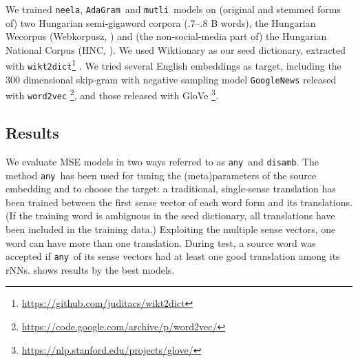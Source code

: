 \documentclass[11pt]{article}
\newcommand{\neelakantan}{\texttt{neela}}
\newcommand{\adagram}{\texttt{AdaGram}}
\newcommand{\mutli}{\texttt{mutli}}
\begin{document}
We trained \neelakantan, \adagram~and \mutli~models on (original and stemmed
forms of) two Hungarian semi-gigaword corpora (.7--.8 B words), the Hungarian
Wecorpus (Webkorpusz, \cite{Halacsy:2004}) and (the non-social-media part of) the
Hungarian National Corpus (HNC, \cite{Oravecz:2014}).  We used Wiktionary as our
seed dictionary, extracted with
\texttt{wikt2dict}\footnote{\url{https://github.com/juditacs/wikt2dict}}
\citep{Acs:2013}. We tried several English embeddings as target, including the
300 dimensional skip-gram with negative sampling model
\texttt{GoogleNews} released with \texttt{word2vec}
\citep{Mikolov:2013f}\footnote{\url{https://code.google.com/archive/p/word2vec/}},
and those released with GloVe
\citep{Pennington:2014}\footnote{\url{https://nlp.stanford.edu/projects/glove/}}.

\subsection{Results}

\newcommand{\any}{\texttt{any}}
\newcommand{\disamb}{\texttt{disamb}}

We evaluate MSE models in two ways referred to as \any~and \disamb.  The method
\any~has been used for tuning the (meta)parameters of the source embedding and
to choose the target: a traditional, single-sense translation has been trained
between the first  sense vector of each word form and its
translations. (If the training word is ambiguous in the seed dictionary, all
translations have been included in the training data.)  Exploiting the multiple
sense vectors, one word can have more than one translation.  During test, a
source word was accepted if \any~of its sense vectors had at
least one good translation among its  rNNs.  shows results by
the best models.
\end{document}
